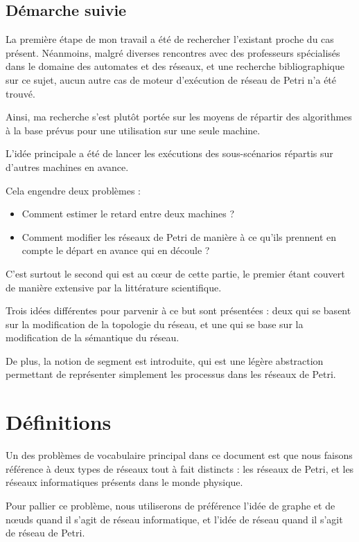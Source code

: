 \subsection{Démarche suivie}
La première étape de mon travail a été de rechercher l'existant proche du cas présent. Néanmoins, malgré diverses rencontres avec des professeurs spécialisés dans le domaine des automates et des réseaux, et une recherche bibliographique sur ce sujet, aucun autre cas de moteur d'exécution de réseau de Petri n'a été trouvé.

Ainsi, ma recherche s'est plutôt portée sur les moyens de répartir des algorithmes à la base prévus pour une utilisation sur une seule machine. 

L'idée principale a été de lancer les exécutions des sous-scénarios répartis sur d'autres machines en avance.

Cela engendre deux problèmes : 
\begin{itemize}
\item Comment estimer le retard entre deux machines ?
\item Comment modifier les réseaux de Petri de manière à ce qu'ils prennent en compte le départ en avance qui en découle ?
\end{itemize}

C'est surtout le second qui est au cœur de cette partie, le premier étant couvert de manière extensive par la littérature scientifique.

Trois idées différentes pour parvenir à ce but sont présentées : deux qui se basent sur la modification de la topologie du réseau, et une qui se base sur la modification de la sémantique du réseau.

De plus, la notion de segment est introduite, qui est une légère abstraction permettant de représenter simplement les processus dans les réseaux de Petri.

\section{Définitions}
Un des problèmes de vocabulaire principal dans ce document est que nous faisons référence à deux types de réseaux tout à fait distincts : les réseaux de Petri, et les réseaux informatiques présents dans le monde physique.

Pour pallier ce problème, nous utiliserons de préférence l'idée de graphe et de nœuds quand il s'agit de réseau informatique, et l'idée de réseau quand il s'agit de réseau de Petri.

